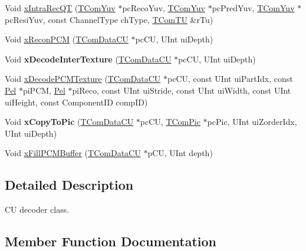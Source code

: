 \begin{DoxyCompactItemize}
\item 
Void \hyperlink{class_t_dec_cu_a4321e8f7ea152651bf335019f4b3b4a6}{x\+Intra\+Rec\+QT} (\hyperlink{class_t_com_yuv}{T\+Com\+Yuv} $\ast$pc\+Reco\+Yuv, \hyperlink{class_t_com_yuv}{T\+Com\+Yuv} $\ast$pc\+Pred\+Yuv, \hyperlink{class_t_com_yuv}{T\+Com\+Yuv} $\ast$pc\+Resi\+Yuv, const Channel\+Type ch\+Type, \hyperlink{class_t_com_t_u}{T\+Com\+TU} \&r\+Tu)
\item 
Void \hyperlink{class_t_dec_cu_aeed7b263063000066618da30fc8dd1f4}{x\+Recon\+P\+CM} (\hyperlink{class_t_com_data_c_u}{T\+Com\+Data\+CU} $\ast$pc\+CU, U\+Int ui\+Depth)
\item 
\mbox{\label{class_t_dec_cu_a44a9cf98e14e82f30c720a2b92a05aec}} 
Void {\bfseries x\+Decode\+Inter\+Texture} (\hyperlink{class_t_com_data_c_u}{T\+Com\+Data\+CU} $\ast$pc\+CU, U\+Int ui\+Depth)
\item 
Void \hyperlink{class_t_dec_cu_a96fde1daad45b7fd22f37e6fe04709a8}{x\+Decode\+P\+C\+M\+Texture} (\hyperlink{class_t_com_data_c_u}{T\+Com\+Data\+CU} $\ast$pc\+CU, const U\+Int ui\+Part\+Idx, const \hyperlink{_type_def_8h_af92141699657699b4b547be0c8517541}{Pel} $\ast$pi\+P\+CM, \hyperlink{_type_def_8h_af92141699657699b4b547be0c8517541}{Pel} $\ast$pi\+Reco, const U\+Int ui\+Stride, const U\+Int ui\+Width, const U\+Int ui\+Height, const Component\+ID comp\+ID)
\item 
\mbox{\label{class_t_dec_cu_a355a7a2f336d39e0f0e195afd1fac08b}} 
Void {\bfseries x\+Copy\+To\+Pic} (\hyperlink{class_t_com_data_c_u}{T\+Com\+Data\+CU} $\ast$pc\+CU, \hyperlink{class_t_com_pic}{T\+Com\+Pic} $\ast$pc\+Pic, U\+Int ui\+Zorder\+Idx, U\+Int ui\+Depth)
\item 
Void \hyperlink{class_t_dec_cu_a9f3b17ff136b9c917ccb8445255fb551}{x\+Fill\+P\+C\+M\+Buffer} (\hyperlink{class_t_com_data_c_u}{T\+Com\+Data\+CU} $\ast$p\+CU, U\+Int depth)
\end{DoxyCompactItemize}


\subsection{Detailed Description}
CU decoder class. 

\subsection{Member Function Documentation}
\mbox{\label{class_t_dec_cu_a1223633054f980c5ad9db3f080bbc5e7}} 
